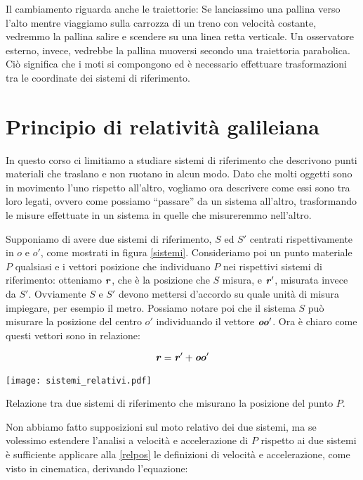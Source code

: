 Il cambiamento riguarda anche le traiettorie: Se lanciassimo una pallina
verso l'alto mentre viaggiamo sulla carrozza di un treno con velocità
costante, vedremmo la pallina salire e scendere su una linea retta verticale.
Un osservatore esterno, invece, vedrebbe la pallina muoversi secondo
una traiettoria parabolica. Ciò significa che i moti si compongono
ed è necessario effettuare trasformazioni tra le coordinate dei
sistemi di riferimento.


\section{Principio di relatività galileiana}
In questo corso ci limitiamo a studiare sistemi di riferimento che
descrivono punti materiali che traslano e non ruotano in
alcun modo. Dato che molti oggetti sono in movimento l'uno rispetto
all'altro, vogliamo ora descrivere come essi sono tra loro legati,
ovvero come possiamo ``passare'' da un sistema all'altro, trasformando
le misure effettuate in un sistema in quelle che misureremmo nell'altro.

Supponiamo di avere due sistemi di riferimento, $S$ ed $S'$
centrati rispettivamente in $o$ e $o'$, come mostrati in figura
\ref{sistemi}. Consideriamo poi un punto materiale $P$ qualsiasi
e i vettori posizione che individuano $P$ nei rispettivi sistemi di riferimento:
otteniamo $\textbf{\textit{r}}$, che è la posizione che $S$ misura,
e $\textbf{\textit{r}}'$, misurata invece da $S'$. Ovviamente $S$ e $S'$
devono mettersi d'accordo su quale unità di misura impiegare, per
esempio il metro. Possiamo notare poi che il
sistema $S$ può misurare la posizione del centro $o'$ individuando
il vettore $\textbf{\textit{oo}}'$. Ora è chiaro come questi vettori sono
in relazione:

\begin{align}
    \textbf{\textit{r}} = \textbf{\textit{r}}' + \textbf{\textit{oo}}'\label{relpos}
\end{align}


\begin{marginfigure}
    \centering
    \texttt{[image: sistemi\_relativi.pdf]}
    \caption{Relazione tra due sistemi di riferimento che misurano
    la posizione del punto $P$.}
    \label{sistemi}
\end{marginfigure}

\noindent Non abbiamo fatto supposizioni sul moto relativo dei
due sistemi, ma se volessimo estendere l'analisi a velocità e
accelerazione di $P$ rispetto ai due sistemi è sufficiente
applicare alla \ref{relpos} le definizioni di velocità e accelerazione,
come visto in cinematica, derivando l'equazione:

